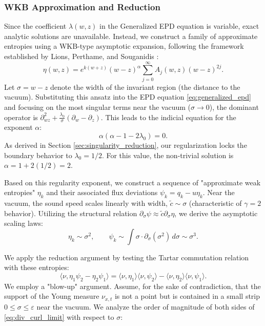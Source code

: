 \documentclass[12pt, reqno]{article}
\theoremstyle{definition}
\numberwithin{equation}{section}
\begin{document}
\subsubsection{WKB Approximation and Reduction}
\label{sec:wkb_reduction}

Since the coefficient $\lambda(w,z)$ in the Generalized EPD equation is variable, exact analytic solutions are unavailable. Instead, we construct a family of approximate entropies using a WKB-type asymptotic expansion, following the framework established by Lions, Perthame, and Souganidis \cite{Lions1996}:
\begin{equation}
    \eta(w, z) = e^{k(w+z)} (w-z)^\alpha \sum_{j=0}^{\infty} A_j(w, z) (w-z)^{2j}.
\end{equation}
Let $\sigma = w-z$ denote the width of the invariant region (the distance to the vacuum). Substituting this ansatz into the EPD equation \eqref{eq:generalized_epd} and focusing on the most singular terms near the vacuum ($\sigma \to 0$), the dominant operator is $\partial_{wz}^2 + \frac{\lambda_0}{\sigma}(\partial_w - \partial_z)$. This leads to the indicial equation for the exponent $\alpha$:
\begin{equation}
    \alpha(\alpha - 1 - 2\lambda_0) = 0.
\end{equation}
As derived in Section \ref{sec:singularity_reduction}, our regularization locks the boundary behavior to $\lambda_0 = 1/2$. For this value, the non-trivial solution is $\alpha = 1 + 2(1/2) = 2$.

Based on this regularity exponent, we construct a sequence of "approximate weak entropies" $\eta_k$ and their associated flux deviations $\psi_k = q_k - u\eta_k$. Near the vacuum, the sound speed scales linearly with width, $\tilde{c} \sim \sigma$ (characteristic of $\gamma=2$ behavior). Utilizing the structural relation $\partial_\sigma \psi \approx \tilde{c} \partial_\sigma \eta$, we derive the asymptotic scaling laws:
\begin{equation} \label{eq:scaling_laws}
    \eta_k \sim \sigma^2, \qquad \psi_k \sim \int \sigma \cdot \partial_\sigma(\sigma^2) \, d\sigma \sim \sigma^3.
\end{equation}

We apply the reduction argument by testing the Tartar commutation relation with these entropies:
\begin{equation} \label{eq:div_curl_limit}
    \langle \nu, \eta_1 \psi_2 - \eta_2 \psi_1 \rangle = \langle \nu, \eta_1 \rangle \langle \nu, \psi_2 \rangle - \langle \nu, \eta_2 \rangle \langle \nu, \psi_1 \rangle.
\end{equation}
We employ a "blow-up" argument. Assume, for the sake of contradiction, that the support of the Young measure $\nu_{x,t}$ is not a point but is contained in a small strip $0 \le \sigma \le \varepsilon$ near the vacuum. We analyze the order of magnitude of both sides of \eqref{eq:div_curl_limit} with respect to $\sigma$:
\end{document}
